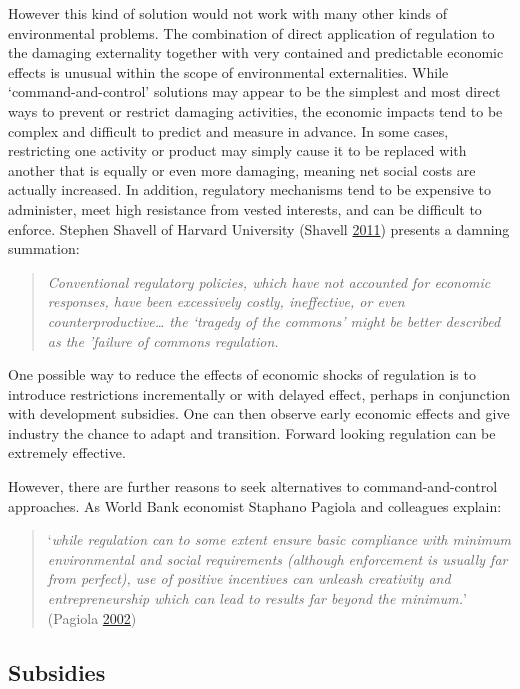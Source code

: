 \documentclass[]{tufte-handout}
\begin{document}
However this kind of solution would not work with many other kinds of
environmental problems. The combination of direct application of
regulation to the damaging externality together with very contained and
predictable economic effects is unusual within the scope of
environmental externalities. While `command-and-control' solutions may
appear to be the simplest and most direct ways to prevent or restrict
damaging activities, the economic impacts tend to be complex and
difficult to predict and measure in advance. In some cases, restricting
one activity or product may simply cause it to be replaced with another
that is equally or even more damaging, meaning net social costs are
actually increased. In addition, regulatory mechanisms tend to be
expensive to administer, meet high resistance from vested interests, and
can be difficult to enforce. Stephen Shavell of Harvard University
(Shavell \protect\hyperlink{ref-Shavell2011}{2011}) presents a damning
summation:

\begin{quote}
\emph{Conventional regulatory policies, which have not accounted for
economic responses, have been excessively costly, ineffective, or even
counterproductive\ldots{} the `tragedy of the commons' might be better
described as the 'failure of commons regulation.}
\end{quote}

One possible way to reduce the effects of economic shocks of regulation
is to introduce restrictions incrementally or with delayed effect,
perhaps in conjunction with development subsidies. One can then observe
early economic effects and give industry the chance to adapt and
transition. Forward looking regulation can be extremely effective.

However, there are further reasons to seek alternatives to
command-and-control approaches. As World Bank economist Staphano Pagiola
and colleagues explain:

\begin{quote}
`\emph{while regulation can to some extent ensure basic compliance with
minimum environmental and social requirements (although enforcement is
usually far from perfect), use of positive incentives can unleash
creativity and entrepreneurship which can lead to results far beyond the
minimum.}' (Pagiola \protect\hyperlink{ref-Pagiola2002}{2002})
\end{quote}

\hypertarget{subsidies}{%
\subsection{Subsidies}\label{subsidies}}
\end{document}
